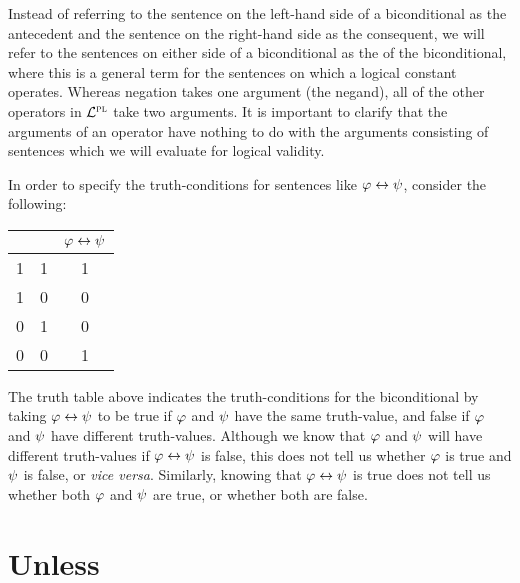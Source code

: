 Instead of referring to the sentence on the left-hand side of a biconditional as the antecedent and the sentence on the right-hand side as the consequent, we will refer to the sentences on either side of a biconditional as the  of the biconditional, where this is a general term for the sentences on which a logical constant operates.
Whereas negation takes one argument (the negand), all of the other operators in $\mathcal{L}^{\textsc{pl}}$ take two arguments.
It is important to clarify that the arguments of an operator have nothing to do with the arguments consisting of sentences which we will evaluate for logical validity.


In order to specify the truth-conditions for sentences like $\varphi\leftrightarrow\psi$, consider the following:

\begin{center}
\begin{tabular}{c|c|c}
\metaA{} & \metaB{} & $\varphi{}\leftrightarrow\psi{}$\\
\hline
1 & 1 & 1\\
1 & 0 & 0\\
0 & 1 & 0\\
0 & 0 & 1
\end{tabular}
\end{center}

The truth table above indicates the truth-conditions for the biconditional by taking $\varphi \leftrightarrow \psi$ to be true if $\varphi$ and $\psi$ have the same truth-value, and false if $\varphi$ and $\psi$ have different truth-values.
Although we know that $\varphi$ and $\psi$ will have different truth-values if $\varphi \leftrightarrow \psi$ is false, this does not tell us whether $\varphi$ is true and $\psi$ is false, or \textit{vice versa}.
Similarly, knowing that $\varphi \leftrightarrow \psi$ is true does not tell us whether both $\varphi$ and $\psi$ are true, or whether both are false. 



\section{Unless}
  \label{sec.unless}

